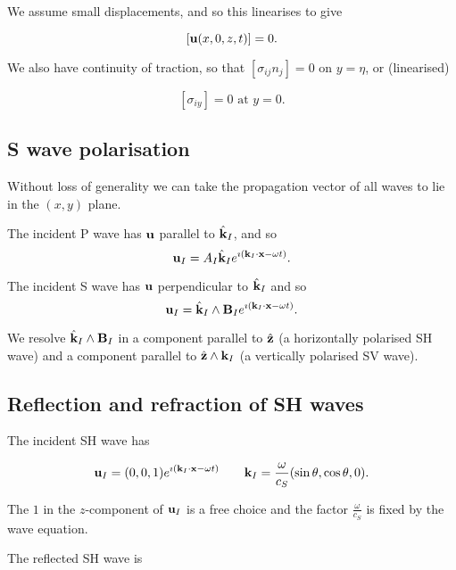 \documentclass{notes}
\newcommand{\vk}{\vect{k}}
\begin{document}
We assume small displacements, and so this linearises to give

\begin{equation}\label{eq:interface1}
\left[ \mathbf{u}(x,0,z,t) \right] = 0.
\end{equation}

We also have continuity of traction, so that
$\left[ \sigma_{ij} n_j \right] = 0$ on $y = \eta$, or (linearised)

\begin{equation}\label{eq:interface2}
\left[ \sigma_{iy} \right] = 0 \text{ at } y = 0.
\end{equation}

\subsection{S wave polarisation}

Without loss of generality we can take the propagation vector of all waves
to lie in the $(x,y)$ plane.

The incident P wave has $\mathbf{u}$ parallel to $\Hat{\vk}_I$, and so
\[
\vu_I = A_I \Hat{\vk}_I e^{\imath\left(\vk_I \cdot \vx - \omega t\right)}.
\]

The incident S wave has $\mathbf{u}$ perpendicular to $\Hat{\vk}_I$ and so
\[
\vu_I = \Hat{\vk}_I \wedge \vect{B}_I e^{\imath\left(\vk_I \cdot \vx
- \omega t\right)}.
\]

We resolve $\Hat{\vk}_I \wedge \vect{B}_I$ in a component parallel
to $\Hat{\mathbf{z}}$ (a horizontally polarised SH wave) and a
component parallel to $\Hat{\vect{z}} \wedge \vk_I$ (a vertically polarised
SV wave).

\subsection{Reflection and refraction of SH waves}

\vspace{1.5in}

The incident SH wave has

\begin{equation}\label{eq:SHinc}
\vu_I = (0,0,1) e^{\imath\left(\vk_I \cdot \vx - \omega t\right)}
\qquad \vk_I = \frac{\omega}{c_S} (\sin \theta,\cos \theta,0).
\end{equation}

The $1$ in the $z$-component of $\mathbf{u}_I$ is a free choice and the factor
$\tfrac{\omega}{c_S}$ is fixed by the wave equation.

The reflected SH wave is
\end{document}
